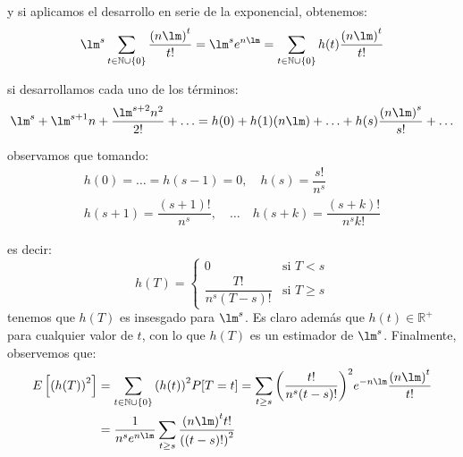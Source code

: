 \begin{ejercicio}
    y si aplicamos el desarrollo en serie de la exponencial, obtenemos:
    \begin{equation*}
        \lm^s \sum_{t\in \mathbb{N}\cup \{0\}} \dfrac{{(n\lm)}^{t}}{t!} = \lm^s e^{n\lm} = \sum_{t\in \mathbb{N}\cup\{0\}} h(t) \dfrac{{(n\lm)}^{t}}{t!} 
    \end{equation*}

    si desarrollamos cada uno de los términos:
    \begin{equation*}
        \lm^s + \lm^{s+1}n + \frac{\lm^{s+2}n^2}{2!} + \ldots = h(0) + h(1)(n\lm) + \ldots + h(s)\dfrac{{(n\lm)}^{s}}{s!} + \ldots
    \end{equation*}

    observamos que tomando:
    \begin{gather*}
        h(0) = \ldots = h(s-1) = 0,\quad  h(s) = \dfrac{s!}{n^s}\\h(s+1) = \dfrac{(s+1)!}{n^s}, \quad \ldots \quad  h(s+k) = \dfrac{(s+k)!}{n^s k!}
    \end{gather*}

    es decir:
    \begin{equation*}
        h(T) = \left\{\begin{array}{ll}
            0 & \text{si\ } T<s \\
            \dfrac{T!}{n^s(T-s)!}& \text{si\ } T\geq s
        \end{array}\right. 
    \end{equation*}
    tenemos que $h(T)$ es insesgado para $\lm^s$. Es claro además que $h(t)\in \mathbb{R}^+$ para cualquier valor de $t$, con lo que $h(T)$ es un estimador de $\lm^s$. Finalmente, observemos que:
    \begin{align*}
        E\left[{(h(T))}^{2}\right] &= \sum_{t\in \mathbb{N}\cup \{0\}} {(h(t))}^{2}P[T=t] = \sum_{t\geq s} {\left(\dfrac{t!}{n^s(t-s)!}\right)}^{2} e^{-n\lm} \dfrac{{(n\lm)}^{t}}{t!} \\ &= \dfrac{1}{n^s e^{n\lm}} \sum_{t\geq s} \dfrac{{(n\lm)}^{t}t!}{{((t-s)!)}^{2}}
    \end{align*}


\end{ejercicio}
